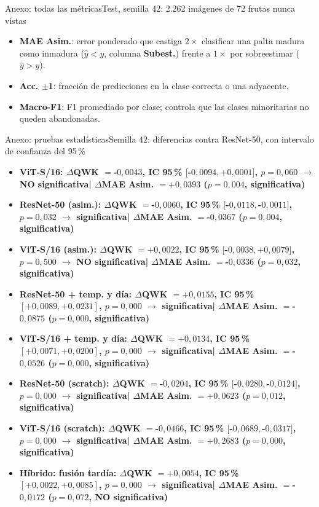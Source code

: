\documentclass[aspectratio=169,11pt,table]{beamer}
\newcommand{\sig}{\textcolor{verdeosc}{\textbf{significativa}}}
\newcommand{\nosig}{\textcolor{rojo}{\textbf{NO significativa}}}
\begin{document}
\begin{frame}{Anexo: todas las métricas}{Test, semilla 42: 2.262 imágenes de 72 frutas nunca vistas}
{\begin{itemize}
  \item \textbf{MAE Asim.}: error ponderado que castiga $2\times$ clasificar una palta madura como inmadura ($\hat{y} < y$, columna \textbf{Subest.}) frente a $1\times$ por sobreestimar ($\hat{y} > y$).
  \item \textbf{Acc. $\pm$1}: fracción de predicciones en la clase correcta o una adyacente.
  \item \textbf{Macro-F1}: F1 promediado por clase; controla que las clases minoritarias no queden abandonadas.
\end{itemize}
}
\end{frame}

\begin{frame}{Anexo: pruebas estadísticas}{Semilla 42: diferencias contra ResNet-50, con intervalo de confianza del 95\,\%}
{\tiny
\setlength{\itemsep}{0.18em}
\begin{itemize}
  \item {\bfseries ViT-S/16: $\Delta$QWK $= $-$0{,}0043$, IC 95\,\% $[$-$0{,}0094, +0{,}0001]$, $p=0{,}060$ $\rightarrow$ \nosig \;|\; $\Delta$MAE Asim. $= +0{,}0393$ ($p=0{,}004$, \sig)}
  \item {\bfseries ResNet-50 (asim.): $\Delta$QWK $= $-$0{,}0060$, IC 95\,\% $[$-$0{,}0118, $-$0{,}0011]$, $p=0{,}032$ $\rightarrow$ \sig \;|\; $\Delta$MAE Asim. $= $-$0{,}0367$ ($p=0{,}004$, \sig)}
  \item {\bfseries ViT-S/16 (asim.): $\Delta$QWK $= +0{,}0022$, IC 95\,\% $[$-$0{,}0038, +0{,}0079]$, $p=0{,}500$ $\rightarrow$ \nosig \;|\; $\Delta$MAE Asim. $= $-$0{,}0336$ ($p=0{,}032$, \sig)}
  \item {\bfseries ResNet-50 + temp. y día: $\Delta$QWK $= +0{,}0155$, IC 95\,\% $[+0{,}0089, +0{,}0231]$, $p=0{,}000$ $\rightarrow$ \sig \;|\; $\Delta$MAE Asim. $= $-$0{,}0875$ ($p=0{,}000$, \sig)}
  \item {\bfseries ViT-S/16 + temp. y día: $\Delta$QWK $= +0{,}0134$, IC 95\,\% $[+0{,}0071, +0{,}0200]$, $p=0{,}000$ $\rightarrow$ \sig \;|\; $\Delta$MAE Asim. $= $-$0{,}0526$ ($p=0{,}000$, \sig)}
  \item {\bfseries ResNet-50 (scratch): $\Delta$QWK $= $-$0{,}0204$, IC 95\,\% $[$-$0{,}0280, $-$0{,}0124]$, $p=0{,}000$ $\rightarrow$ \sig \;|\; $\Delta$MAE Asim. $= +0{,}0623$ ($p=0{,}012$, \sig)}
  \item {\bfseries ViT-S/16 (scratch): $\Delta$QWK $= $-$0{,}0466$, IC 95\,\% $[$-$0{,}0689, $-$0{,}0317]$, $p=0{,}000$ $\rightarrow$ \sig \;|\; $\Delta$MAE Asim. $= +0{,}2683$ ($p=0{,}000$, \sig)}
  \item {\bfseries Híbrido: fusión tardía: $\Delta$QWK $= +0{,}0054$, IC 95\,\% $[+0{,}0022, +0{,}0085]$, $p=0{,}000$ $\rightarrow$ \sig \;|\; $\Delta$MAE Asim. $= $-$0{,}0172$ ($p=0{,}072$, \nosig)}

\end{itemize}}
\end{frame}
\end{document}
